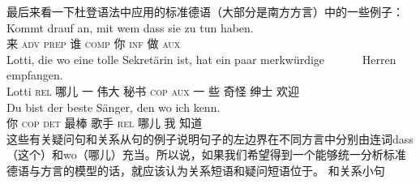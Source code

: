 最后来看一下杜登语法\citep[§1347]{Duden2005-Authors}中应用的标准德语（大部分是南方方言）中的一些例子：
\eal
\ex 
\gll Kommt drauf an, mit wem dass sie zu tun haben.\\
     来 \textsc{adv} \partic{} \textsc{prep} 谁 \textsc{comp} 你 \textsc{inf} 做 \textsc{aux}\\
\zl
\eal
\ex 
\gll Lotti, die wo eine tolle Sekretärin ist, hat ein paar merkwürdige~~~~~~ Herren empfangen.\\
     Lotti  \textsc{rel} 哪儿 一 伟大 秘书 \textsc{cop} \textsc{aux} 一 些 奇怪 绅士 欢迎\\
\ex 
\gll Du bist der beste Sänger, den wo ich kenn.\\
     你 \textsc{cop} \textsc{det} 最棒 歌手   \textsc{rel} 哪儿 我 知道\\
\zl
这些有关疑问句和关系从句的例子说明句子的左边界在不同方言中分别由连词dass（这个）和wo（哪儿）充当。所以说，如果我们希望得到一个能够统一分析标准德语与方言的模型的话，就应该认为关系短语和疑问短语位于\vf。
和关系小句

